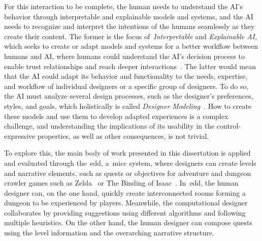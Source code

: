 For this interaction to be complete, the human needs to understand the AI's behavior through interpretable and explainable models and systems, and the AI needs to recognize and interpret the intentions of the humans seamlessly as they create their content. The former is the focus of~\emph{Interpretable} and \emph{Explainable AI}, which seeks to create or adapt models and systems for a better workflow between humans and AI, where humans could understand the AI's decision process to enable trust relationships and reach deeper interactions~\cite{zhu_explainable_2018,doshi-velez_considerations_2018,adadi_peeking_2018}. The latter would mean that the AI could adapt its behavior and functionality to the needs, expertise, and workflow of individual designers or a specific group of designers. To do so, the AI must analyze several design processes, such as the designer's preferences, styles, and goals, which holistically is called \emph{Designer Modeling}~\cite{liapis_designer_2013,liapis_designer_2014}. How to create these models and use them to develop adapted experiences is a complex challenge, and understanding the implications of its usability in the control-expressive properties, as well as other consequences, is not trivial.

To explore this, the main body of work presented in this dissertation is applied and evaluated through the~\acrfull{edd}, a~\acrlong{micc} system, where designers can create levels and narrative elements, such as quests or objectives for adventure and dungeon crawler games such as Zelda~\cite{tloz} or The Binding of Isaac~\cite{bindingISAAC}. In~\acrshort{edd}, the human designer can, on the one hand, quickly create interconnected rooms forming a dungeon to be experienced by players. Meanwhile, the computational designer collaborates by providing suggestions using different algorithms and following multiple heuristics. On the other hand, the human designer can compose quests using the level information and the overarching narrative structure. 


